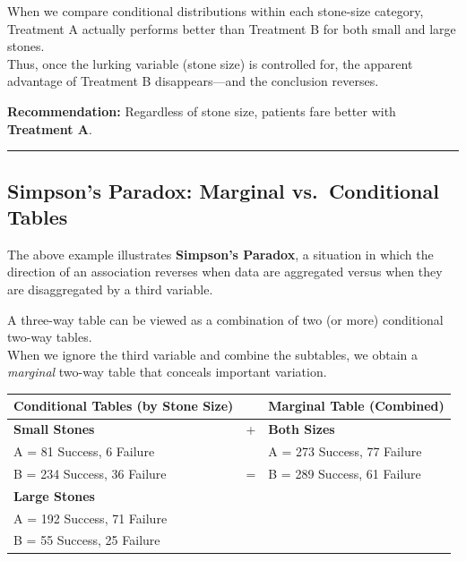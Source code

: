 \documentclass[
  letterpaper,
  DIV=11,
  numbers=noendperiod]{scrreprt}
\begin{document}
When we compare conditional distributions within each stone-size
category, Treatment A actually performs better than Treatment B for both
small and large stones.\\
Thus, once the lurking variable (stone size) is controlled for, the
apparent advantage of Treatment B disappears---and the conclusion
reverses.

\textbf{Recommendation:} Regardless of stone size, patients fare better
with \textbf{Treatment A}.

\begin{center}\rule{0.5\linewidth}{0.5pt}\end{center}

\subsection{Simpson's Paradox: Marginal vs.~Conditional
Tables}\label{simpsons-paradox-marginal-vs.-conditional-tables}

The above example illustrates \textbf{Simpson's Paradox}, a situation in
which the direction of an association reverses when data are aggregated
versus when they are disaggregated by a third variable.

A three-way table can be viewed as a combination of two (or more)
conditional two-way tables.\\
When we ignore the third variable and combine the subtables, we obtain a
\emph{marginal} two-way table that conceals important variation.

\begin{longtable}[]{@{}
  >{\raggedright\arraybackslash}p{}
  >{\raggedright\arraybackslash}p{}
  >{\raggedright\arraybackslash}p{}@{}}
\toprule\noalign{}
\begin{minipage}[b]{\linewidth}\raggedright
\textbf{Conditional Tables (by Stone Size)}
\end{minipage} & \begin{minipage}[b]{\linewidth}\raggedright
\end{minipage} & \begin{minipage}[b]{\linewidth}\raggedright
\textbf{Marginal Table (Combined)}
\end{minipage} \\
\midrule\noalign{}
\endhead
\bottomrule\noalign{}
\endlastfoot
\textbf{Small Stones} & + & \textbf{Both Sizes} \\
A = 81 Success, 6 Failure & & A = 273 Success, 77 Failure \\
B = 234 Success, 36 Failure & = & B = 289 Success, 61 Failure \\
\textbf{Large Stones} & & \\
A = 192 Success, 71 Failure & & \\
B = 55 Success, 25 Failure & & \\
\end{longtable}
\end{document}
